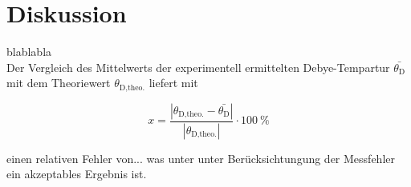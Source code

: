 \section{Diskussion}
\label{sec:Diskussion}

blablabla\\

Der Vergleich des Mittelwerts der experimentell ermittelten Debye-Tempartur $\bar{\theta_\text{D}}$ mit dem Theoriewert 
$\theta_\text{D,theo.}$ liefert mit 

\begin{equation*}
    x = \frac{|\theta_\text{D,theo.}-\bar{\theta_\text{D}}|}{|\theta_\text{D,theo.}|}\cdot \SI{100}{\percent}
\end{equation*}

einen relativen Fehler von... was unter unter Berücksichtungung der Messfehler ein akzeptables Ergebnis ist. 